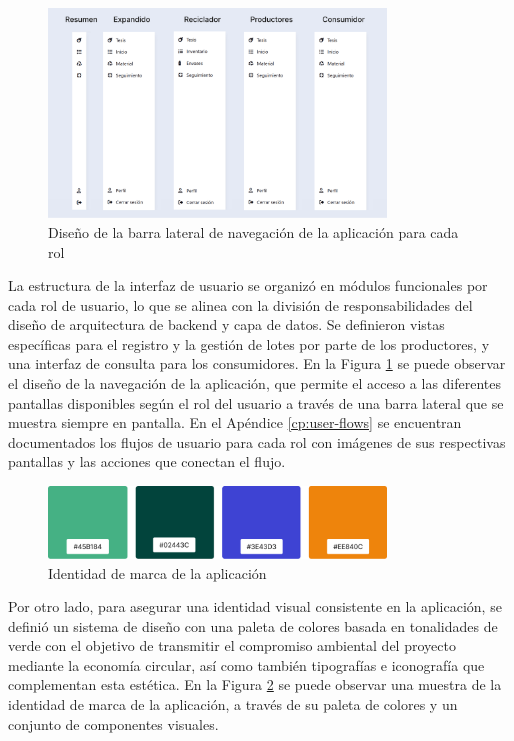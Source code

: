\begin{figure}[!htb]
    \centering
    \includegraphics[width=0.8\textwidth]{Figures/frontend-navigation.png}
    \caption{Diseño de la barra lateral de navegación de la aplicación para cada rol}
    \label{fig:frontend-navigation}
\end{figure}

La estructura de la interfaz de usuario se organizó en módulos funcionales por cada rol de usuario, lo que se alinea con la división de responsabilidades del diseño de arquitectura de backend y capa de datos. Se definieron vistas específicas para el registro y la gestión de lotes por parte de los productores, y una interfaz de consulta para los consumidores. En la Figura \ref{fig:frontend-navigation} se puede observar el diseño de la navegación de la aplicación, que permite el acceso a las diferentes pantallas disponibles según el rol del usuario a través de una barra lateral que se muestra siempre en pantalla. En el Apéndice \ref{cp:user-flows} se encuentran documentados los flujos de usuario para cada rol con imágenes de sus respectivas pantallas y las acciones que conectan el flujo.

\begin{figure}[!htb]
    \centering
    \includegraphics[width=0.8\textwidth]{Figures/frontend-palette.png}
    \caption{Identidad de marca de la aplicación}
    \label{fig:frontend-brand}
\end{figure}

Por otro lado, para asegurar una identidad visual consistente en la aplicación, se definió un sistema de diseño con una paleta de colores basada en tonalidades de verde con el objetivo de transmitir el compromiso ambiental del proyecto mediante la economía circular, así como también tipografías e iconografía que complementan esta estética. En la Figura \ref{fig:frontend-brand} se puede observar una muestra de la identidad de marca de la aplicación, a través de su paleta de colores y un conjunto de componentes visuales.

